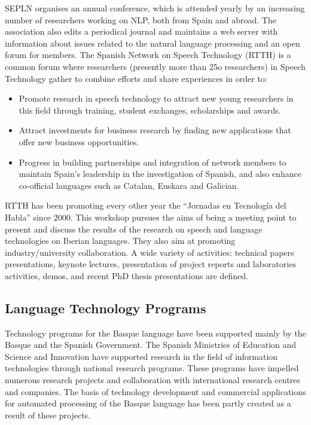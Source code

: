 \begin{multicols}{2}
SEPLN organises an annual conference, which is attended yearly by an increasing number of researchers working on NLP, both from Spain and abroad. The association also edits a periodical journal and maintains a web server with information about issues related to the natural language processing and an open forum for members.
The Spanish Network on Speech Technology (RTTH) \cite{BAS-Nota36}  is a common forum where researchers (presently more than 25o researchers) in Speech Technology gather to combine efforts and share experiences in order to:
\begin{itemize}

       \item Promote research in speech technology to attract new young researchers in this field through training, student exchanges, scholarships and awards.
       
       \item Attract investments for business research by finding new applications that offer new business opportunities.  
      
      \item Progress in building partnerships and integration of network members to maintain Spain's leadership in the investigation of Spanish, and also enhance co-official languages such as Catalan, Euskara and Galician.

\end{itemize}

RTTH has been promoting every other year the “Jornadas en Tecnología del Habla” since 2000. This workshop pursues the aims of being a meeting point to present and discuss the results of the research on speech and language technologies on Iberian languages. They also aim at promoting industry/university collaboration. A wide variety of activities: technical papers presentations, keynote lectures, presentation of project reports and laboratories activities, demos, and recent PhD thesis presentations are defined.

\subsection{Language Technology Programs}
    Technology programs for the Basque language have been supported mainly by the Basque and the Spanish Government. 
The Spanish Ministries of Education and Science and Innovation have supported research in the field of information technologies through national research programs. These programs have impelled numerous research projects and collaboration with international research centres and companies. The basis of technology development and commercial applications for automated processing of the Basque language has been partly created as a result of these projects.


\end{multicols}
